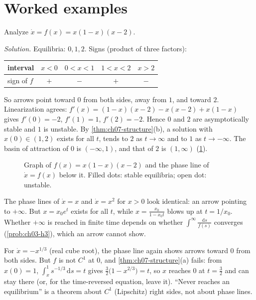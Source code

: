 \section{Worked examples}\label{sec:ch07-examples}

\begin{example}\label{ex:ch07-cubic}
Analyze $\dot x = f(x) = x(1-x)(x-2)$.

\emph{Solution.} Equilibria: $0,1,2$. Signs (product of three factors):
\begin{center}
\begin{tabular}{@{}lcccc@{}}
  \toprule
  interval & $x<0$ & $0<x<1$ & $1<x<2$ & $x>2$\\
  \midrule
  sign of $f$ & $+$ & $-$ & $+$ & $-$\\
  \bottomrule
\end{tabular}
\end{center}
So arrows point toward $0$ from both sides, away from $1$, and toward $2$.
Linearization agrees: $f'(x) = (1-x)(x-2) - x(x-2) + x(1-x)$ gives
$f'(0) = -2$, $f'(1) = 1$, $f'(2) = -2$. Hence $0$ and $2$ are asymptotically
stable and $1$ is unstable. By \cref{thm:ch07-structure}(b), a solution with
$x(0)\in(1,2)$ exists for all $t$, tends to $2$ as $t\to\infty$ and to $1$ as
$t\to-\infty$. The basin of attraction of $0$ is $(-\infty,1)$, and that of
$2$ is $(1,\infty)$ (\cref{fig:ch07-phase}).
\end{example}

\begin{figure}[ht]
  \centering
  
  \caption{Graph of $f(x) = x(1-x)(x-2)$ and the phase line of $\dot x = f(x)$
  below it. Filled dots: stable equilibria; open dot: unstable.}
  \label{fig:ch07-phase}
\end{figure}

\begin{example}\label{ex:ch07-blowup}
The phase lines of $\dot x = x$ and $\dot x = x^2$ for $x>0$ look identical:
an arrow pointing to $+\infty$. But $x = x_0e^t$ exists for all $t$, while
$x = \frac{x_0}{1 - x_0t}$ blows up at $t = 1/x_0$. Whether $+\infty$ is reached
in finite time depends on whether $\int^\infty\frac{\mathrm{d}s}{f(s)}$
converges (\cref{prob:ch03-h3}), which an arrow cannot show.
\end{example}

\begin{example}\label{ex:ch07-reach}
For $\dot x = -x^{1/3}$ (real cube root), the phase line again shows arrows
toward $0$ from both sides. But $f$ is not $C^1$ at $0$, and
\cref{thm:ch07-structure}(a) fails: from $x(0) = 1$,
$\int_x^1 s^{-1/3}\,\mathrm{d}s = t$ gives $\tfrac32\bigl(1 - x^{2/3}\bigr) = t$,
so $x$ reaches $0$ at $t = \frac32$ and can stay there (or, for the
time-reversed equation, leave it). ``Never reaches an equilibrium'' is a
theorem about $C^1$ (Lipschitz) right sides, not about phase lines.
\end{example}

